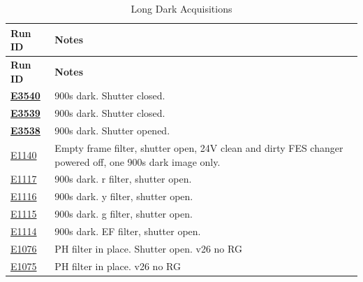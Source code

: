 \begin{longtable}{|p{5.0cm}|p{8.5cm}|}
\caption{Long Dark Acquisitions}\label{table:runs_dark} \\
\hline
\textbf{Run ID} & \textbf{Notes} \\ \hline
\endfirsthead
\hline
\textbf{Run ID} & \textbf{Notes} \\ \hline
\endhead
\hline
\endfoot
\hline
\endlastfoot

\textbf{\href{https://s3df.slac.stanford.edu/data/rubin/lsstcam/E3540/w_2024_35/}{E3540}} & 900s dark. Shutter closed. \\ \hline
\textbf{\href{https://s3df.slac.stanford.edu/data/rubin/lsstcam/E3539/w_2024_35/}{E3539}} & 900s dark. Shutter closed. \\ \hline
\textbf{\href{https://s3df.slac.stanford.edu/data/rubin/lsstcam/E3538/w_2024_35/}{E3538}} & 900s dark. Shutter opened. \\ \hline
\href{https://s3df.slac.stanford.edu/data/rubin/lsstcam/E1140/w_2024_35/}{E1140} & Empty frame filter, shutter open, 24V clean and dirty FES changer powered off, one 900s dark image only. \\ \hline
\href{https://s3df.slac.stanford.edu/data/rubin/lsstcam/E1117/w_2024_35/}{E1117} & 900s dark. r filter, shutter open. \\ \hline
\href{https://s3df.slac.stanford.edu/data/rubin/lsstcam/E1116/w_2024_35/}{E1116} & 900s dark. y filter, shutter open. \\ \hline
\href{https://s3df.slac.stanford.edu/data/rubin/lsstcam/E1115/w_2024_35/}{E1115} & 900s dark. g filter, shutter open. \\ \hline
\href{https://s3df.slac.stanford.edu/data/rubin/lsstcam/E1114/w_2024_35/}{E1114} & 900s dark. EF filter, shutter open. \\ \hline
\href{https://s3df.slac.stanford.edu/data/rubin/lsstcam/E1076/w_2024_35/}{E1076} & PH filter in place. Shutter open. v26 no RG \\ \hline
\href{https://s3df.slac.stanford.edu/data/rubin/lsstcam/E1075/w_2024_35/}{E1075} & PH filter in place. v26 no RG \\ \hline

\end{longtable}

